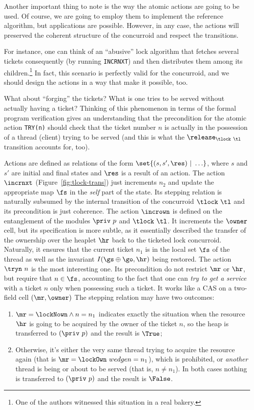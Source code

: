 Another important thing to note is the way the atomic actions are
going to be used. Of course, we are going to employ them to implement
the reference algorithm, but applications are possible. However, in
any case, the actions will preserved the coherent structure of the
concurroid and respect the transitions.

For instance, one can think of an ``abusive'' lock algorithm that
fetches several tickets consequently (by running \texttt{INCRNXT}) and
then distributes them among its children.\footnote{One of the authors
  witnessed this situation in a real bakery.} In fact, this scenario
is perfectly valid for the concurroid, and we should design the
actions in a way that make it possible, too.

What about ``forging'' the tickets? What is one tries to be served
without actually having a ticket? Thinking of this phenomenon in terms
of the formal program verification gives an understanding that the
precondition for the atomic action \texttt{TRY(n)} should check that
the ticket number $n$ is actually in the possession of a thread
(client) trying to be served (and this is what the
$\release_{\tlock~\tl}$ transition accounts for, too).

Actions are defined as relations of the form $\set{(s, s', \res)
  ~|~ \ldots}$, where $s$ and $s'$ are initial and final states and
$\res$ is a result of an action.
%
The action $\incrnxt$ (Figure~\ref{fig:tlock-trans}) just increments
$n_2$ and update the appropriate map $\fs$ in the \emph{self} part of
the state. Its stepping relation is naturally subsumed by the internal
transition of the concurroid $\tlock~\tl$ and its precondition is just
coherence. The action $\incrown$ is defined on the entanglement of the
modules $\priv~p$ and $\tlock~\tl$. It increments the $\owner$ cell,
but its specification is more subtle, as it essentially described the
transfer of the ownership over the heaplet $\hr$ back to the ticketed
lock concurroid. Naturally, it ensures that the current ticket $n_1$
is in the local set $\fs$ of the thread as well as the invariant
$I(\gs \oplus \go, \hr)$ being restored. The action $\tryn~n$ is the
most interesting one. Its precondition do not restrict $\mr$ or $\hr$,
but require that $n \in \fs$, accounting to the fact that one can
\emph{try to get a service} with a ticket $n$ only when possessing
such a ticket. It works like a CAS on a two-field cell $(\mr, \owner)$
The stepping relation may have two outcomes:

\begin{enumerate}
\item $\mr = \lockNown \wedge n = n_1$ indicates exactly  the situation
  when the resource $\hr$ is going to be acquired by the owner of the
  ticket $n$, so the heap is transferred to $(\priv~p)$ and the result
  is $\True$;
\item Otherwise, it's either the very same thread trying to acquire
  the resource again (that is $\mr = \lockOwn\ wedge n = n_1$), which
  is prohibited, or \emph{another} thread is being or about to be
  served (that is, $n \neq n_1$). In both cases nothing is transferred
  to $(\priv~p)$ and the result is $\False$.
\end{enumerate}

